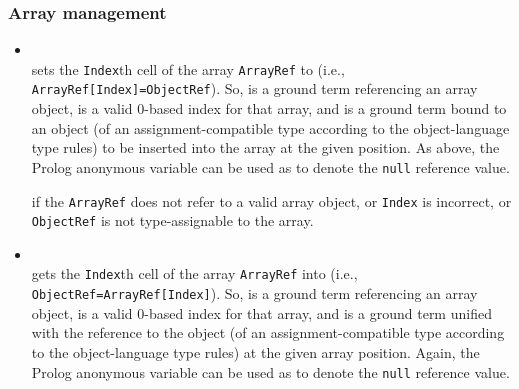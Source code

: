 \subsubsection{Array management}
\begin{itemize}

\item {}\\
     sets the \texttt{Index}th cell of the array \texttt{ArrayRef} to  (i.e., \texttt{ArrayRef[Index]=ObjectRef}).
    So,  is a ground term referencing an array object,  is a valid 0-based index for that array, and  is a ground term bound to an object (of an assignment-compatible type according to the object-language type rules) to be inserted into the array at the given position.
    As above, the Prolog anonymous variable can be used as  to denote the \texttt{null} reference value.

%


     if the \texttt{ArrayRef} does not refer to a valid array object, or \texttt{Index} is incorrect, or \texttt{ObjectRef} is not type-assignable to the array.

\item {}\\
     gets the \texttt{Index}th cell of the array \texttt{ArrayRef} into  (i.e., \texttt{ObjectRef=ArrayRef[Index]}).
    So,  is a ground term referencing an array object,  is a valid 0-based index for that array, and  is a ground term unified with the reference to the object (of an assignment-compatible type according to the object-language type rules) at the given array position.
    Again, the Prolog anonymous variable can be used as  to denote the \texttt{null} reference value.


\end{itemize}
